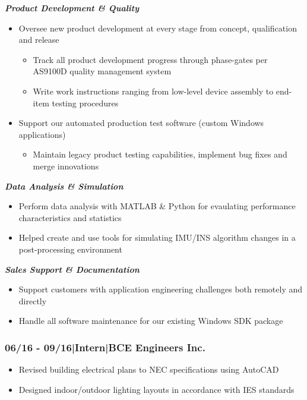 \documentclass[]{article}
\begin{document}
\noindent\textbf{\emph{Product Development \& Quality}}
\begin{itemize}
    \setlength\itemsep{0.05em}
    \item Oversee new product development at every stage from concept, qualification and release
    \begin{itemize}
        \setlength\itemsep{0.05em}
        \item Track all product development progress through phase-gates per AS9100D quality management system
        \item Write work instructions ranging from low-level device assembly to end-item testing procedures
    \end{itemize}
    \item Support our automated production test software (custom Windows applications)
    \begin{itemize}
        \setlength\itemsep{0.05em}
        \item Maintain legacy product testing capabilities, implement bug fixes and merge innovations
    \end{itemize}
\end{itemize}

\noindent\textbf{\emph{Data Analysis \& Simulation}}
\begin{itemize}
    \setlength\itemsep{0.05em}
    \item Perform data analysis with MATLAB \& Python for evaulating performance characteristics and statistics
    \item Helped create and use tools for simulating IMU/INS algorithm changes in a post-processing environment
\end{itemize}

\noindent\textbf{\emph{Sales Support \& Documentation}}
\begin{itemize}
    \setlength\itemsep{0.05em}
    \item Support customers with application engineering challenges both remotely and directly
    \item Handle all software maintenance for our existing Windows SDK package
\end{itemize}



\subsubsection*{06/16 - 09/16\hspace{3 mm}|\hspace{3 mm}Intern\hspace{3 mm}|\hspace{3 mm}BCE Engineers Inc.}
\begin{itemize}
    \setlength\itemsep{0.05em}
    \item Revised building electrical plans to NEC specifications using AutoCAD
    \item Designed indoor/outdoor lighting layouts in accordance with IES standards 
\end{itemize}
\end{document}

